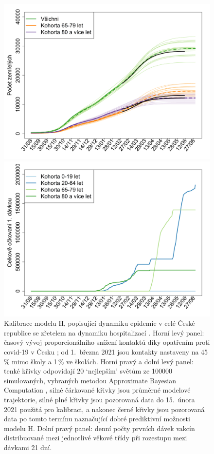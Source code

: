 \begin{figure}[h]
\begin{center}
\begin{minipage}[m]{0.45\linewidth}
			\includegraphics[width=\textwidth]{pic/vakcinace-death.png}
		\end{minipage} 
		\begin{minipage}[m]{0.45\linewidth}
			\includegraphics[width=\textwidth]{pic/vakcinace-davky.png}
		\end{minipage} 
	\end{center}
	\caption{Kalibrace modelu H, popisující dynamiku epidemie v celé České republice se zřetelem na dynamiku hospitalizací \cite{vaccpaper}. Horní levý panel: časový vývoj proporcionálního snížení kontaktů díky opatřením proti covid-19 v Česku \cite{paqcovid}; od 1.\ března 2021 jsou kontakty nastaveny na 45\,\% mimo školy a 1\,\% ve školách. Horní pravý a dolní levý panel: tenké křivky odpovídají 20 `nejlepším' světům ze 100000 simulovaných, vybraných metodou Approximate Bayesian Computation \cite{Toni_etal2009}, silné čárkované křivky jsou průměrné modelové trajektorie, silné plné křivky jsou pozorovaná data do 15.\ února 2021 použitá pro kalibraci, a nakonec černé křivky jsou pozorovaná data po tomto termínu naznačující dobré prediktivní možnosti modelu H. Dolní pravý panel: denní počty prvních dávek vakcín distribuované mezi jednotlivé věkové třídy při rozestupu mezi dávkami 21 dní.}
	\label{kalibraceH}
\end{figure}

